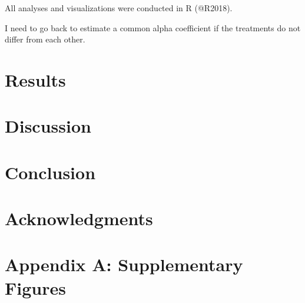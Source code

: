 \documentclass[11pt]{article}
\begin{document}
All analyses and visualizations were conducted in R (@R2018). 

I need to go back to estimate a common alpha coefficient if the treatments do not differ from each other.

\section*{Results}


\section*{Discussion}

\section*{Conclusion}



\section*{Acknowledgments}

\newpage{}

\section*{Appendix A: Supplementary Figures}




\end{document}

